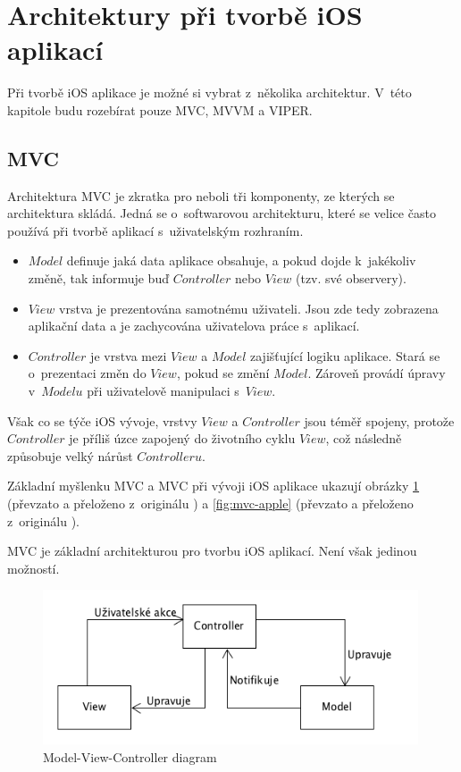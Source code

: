 \documentclass[thesis=M,czech]{FITthesis}[2012/06/26]
\begin{document}
\section{Architektury při tvorbě iOS aplikací}
Při tvorbě iOS aplikace je možné si vybrat z~několika architektur. V~této kapitole budu rozebírat pouze MVC, MVVM a VIPER.

\subsection{MVC}
Architektura MVC je zkratka pro  neboli tři komponenty, ze kterých se architektura skládá. Jedná se o~softwarovou architekturu, které se velice často používá při tvorbě aplikací s~uživatelským rozhraním. \cite{MVCMozilla}
\begin{itemize}
\item $Model$ definuje jaká data aplikace obsahuje, a pokud dojde k~jakékoliv změně, tak informuje buď $Controller$ nebo $View$ (tzv. své observery). \cite{MVCGoogle}
\item $View$ vrstva je prezentována samotnému uživateli. Jsou zde tedy zobrazena aplikační data a je zachycována uživatelova práce s~aplikací.\cite{MVCMozilla}
\item $Controller$ je vrstva mezi $View$ a $Model$ zajišťující logiku aplikace. Stará se o~prezentaci změn do $View$, pokud se změní $Model$. Zároveň provádí úpravy v~$Modelu$ při uživatelově manipulaci s~$View$.  \cite{MVCGoogle}
\end{itemize}

Však co se týče iOS vývoje, vrstvy $View$ a $Controller$ jsou téměř spojeny, protože $Controller$ je příliš úzce zapojený do životního cyklu $View$, což následně způsobuje velký nárůst $Controlleru$.\cite{Orlov}

Základní myšlenku MVC a MVC při vývoji iOS aplikace ukazují obrázky \ref{fig:mvc} (převzato a přeloženo z~originálu \cite{mvc-pic}) a \ref{fig:mvc-apple} (převzato a přeloženo z~originálu \cite{mvc-apple-pic}).

MVC je základní architekturou pro tvorbu iOS aplikací. Není však jedinou možností.

\begin{figure}[h]\centering
 \includegraphics[width=0.99\textwidth]{./pictures/architektury/model_view_controller}
 \caption[Model-View-Controller diagram]{Model-View-Controller diagram}\label{fig:mvc}
\end{figure}
\end{document}
